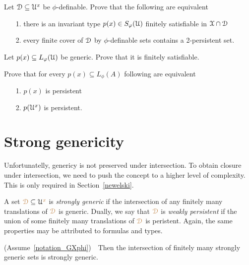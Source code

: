 \begin{exercise}
  Let $\EuScript D\subseteq\EuScript U^x$ be $\phi$-definable.
  Prove that the following are equivalent 
  \begin{itemize}
    \item[1.] there is an invariant type $p(x)\in S_\varphi(\EuScript U)$ finitely satisfiable in $\EuScript X\cap\EuScript D$
    \item[2.] every finite cover of $\EuScript D$ by $\phi$-definable sets contains a 2-persistent set.
  \end{itemize}
\end{exercise}

\begin{exercise}\label{ex_gen_sat}
  Let $p(x)\subseteq L_\varphi(\EuScript U)$ be generic.
  Prove that it is finitely satisfiable.
\end{exercise}

\begin{exercise}\label{ex_persistent_types}
  Prove that for every $p(x)\subseteq L_\phi(A)$ following are equivalent
  \begin{itemize}
    \item[1.] $p(x)$ is persistent
    \item[2.] $p(\EuScript U^x)$ is persistent.
  \end{itemize}
\end{exercise}

\section{Strong genericity}\label{strong_genericity}

Unfortunatelly, genericy is not preserved under intersection.
To obtain closure under intersection, we need to push the concept to a higher level of complexity.
This is only required in Section~\ref{newelski}.

A set ${\color{brown}\EuScript D}\subseteq\EuScript U^{\color{brown} x}$ is \emph{strongly generic\/} if the intersection of any finitely many translations of ${\color{brown}\EuScript D}$ is generic.
Dually, we say that ${\color{brown}\EuScript D}$ is \emph{weakly persistent\/} if the union of some finitely many translations of ${\color{brown}\EuScript D}$ is peristent.
Again, the same properties may be attributed to formulas and types.

\begin{lemma}\label{lem_strongly_generic}
  (Assume~\ref{notation_GXphi})\ \  
  Then the intersection of finitely many strongly generic sets is strongly generic.
\end{lemma}

